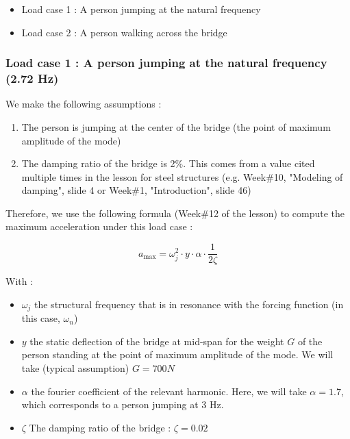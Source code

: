 \begin{itemize}
\tightlist
\item
  Load case 1 : A person jumping at the natural frequency
\item
  Load case 2 : A person walking across the bridge
\end{itemize}

\hypertarget{load-case-1--a-person-jumping-at-the-natural-frequency-272-hz}{%
\subsubsection{Load case 1 : A person jumping at the natural frequency
(2.72
Hz)}\label{load-case-1--a-person-jumping-at-the-natural-frequency-272-hz}}

We make the following assumptions :

\begin{enumerate}
\tightlist
\item
  The person is jumping at the center of the bridge (the point of
  maximum amplitude of the mode)
\item
  The damping ratio of the bridge is 2\%. This comes from a value cited
  multiple times in the lesson for steel structures (e.g. Week\#10,
  "Modeling of damping", slide 4 or Week\#1, "Introduction", slide 46)
\end{enumerate}

Therefore, we use the following formula (Week\#12 of the lesson) to
compute the maximum acceleration under this load case :

\[
a_{\max }=\omega_j^2 \cdot y \cdot \alpha \cdot \frac{1}{2 \zeta}
\]

With :

\begin{itemize}
\tightlist
\item
  \(\omega_j\) the structural frequency that is in resonance with the
  forcing function (in this case, \(\omega_n\))
\item
  \(y\) the static deflection of the bridge at mid-span for the weight
  \(G\) of the person standing at the point of maximum amplitude of the
  mode. We will take (typical assumption) \(G = 700 N\)
\item
  \(\alpha\) the fourier coefficient of the relevant harmonic. Here, we
  will take \(\alpha = 1.7\), which corresponds to a person jumping at 3
  Hz.
\item
  \(\zeta\) The damping ratio of the bridge : \(\zeta = 0.02\)
\end{itemize}


